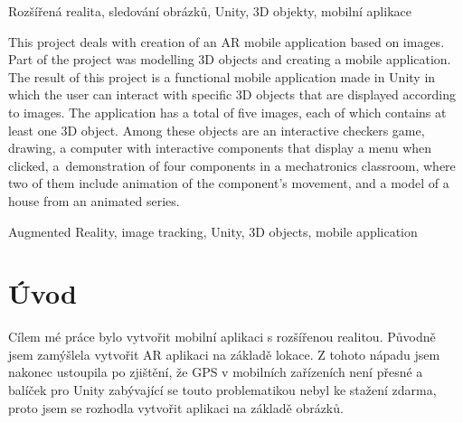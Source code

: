 \documentclass[12pt, a4paper,
twoside,        %
openright
]{report}
\begin{document}
	
	\vspace{18pt}
	
	
	\noindent Rozšířená realita, sledování obrázků, Unity, 3D objekty, mobilní aplikace
	
	\vspace{18pt}

	
This project deals with creation of an AR mobile application based on images. Part of the project was modelling 3D objects and creating a mobile application.  The result of this project is a functional mobile application made in Unity in which the user can interact with specific 3D objects that are displayed according to images. 
The application has a total of five images, each of which contains at least one 3D object. Among these objects are an interactive checkers game, drawing, a computer with interactive components that display a menu when clicked, a~demonstration of four components in a mechatronics classroom, where two of them include animation of the component's movement, and a model of a house from an animated series.
	
	\vspace{18pt}
	
	
	\noindent Augmented Reality, image tracking, Unity, 3D objects, mobile application
	
	\clearpage %

	
	\tableofcontents %

	\setcounter{page}{1} %

	\chapter*{Úvod}
Cílem mé práce bylo vytvořit mobilní aplikaci s rozšířenou realitou.  Původně jsem zamýšlela vytvořit AR aplikaci na základě lokace.  Z tohoto nápadu jsem nakonec ustoupila po zjištění, že GPS v mobilních zařízeních není přesné a balíček pro Unity zabývající se touto problematikou nebyl ke stažení zdarma, proto jsem se rozhodla vytvořit aplikaci na základě obrázků.
 
\end{document}
